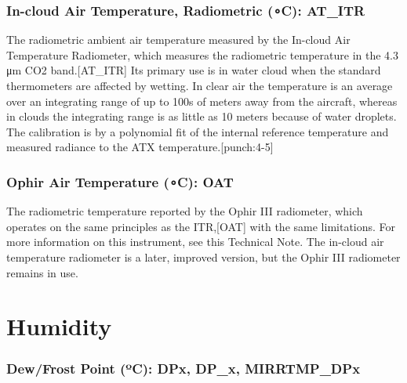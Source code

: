 \documentclass[
  english,
]{book}
\begin{document}
\hypertarget{AT-ITR}{%
\subsubsection*{\texorpdfstring{In-cloud Air Temperature, Radiometric ({∘}C): AT\_ITR}{In-cloud Air Temperature, Radiometric (∘C): AT\_ITR}}\label{AT-ITR}}

The radiometric ambient air temperature measured by the In-cloud Air Temperature Radiometer, which measures the radiometric temperature in the 4.3 {μ}m CO{2} band.\protect\hypertarget{AT_ITR}{}{{[}AT\_ITR{]}} Its primary use is in water cloud when the standard thermometers are affected by wetting. In clear air the temperature is an average over an integrating range of up to 100s of meters away from the aircraft, whereas in clouds the integrating range is as little as 10 meters because of water droplets. The calibration is by a polynomial fit of the internal reference temperature and measured radiance to the ATX temperature.\protect\hypertarget{punch:4-5}{}{{[}punch:4-5{]}}

\hypertarget{OAT}{%
\subsubsection*{\texorpdfstring{Ophir Air Temperature ({∘}C): OAT}{Ophir Air Temperature (∘C): OAT}}\label{OAT}}

The radiometric temperature reported by the Ophir III radiometer, which operates on the same principles as the ITR,\protect\hypertarget{OAT}{}{{[}OAT{]}} with the same limitations. For more information on this instrument, see this Technical Note. The in-cloud air temperature radiometer is a later, improved version, but the Ophir III radiometer remains in use.

\hypertarget{humidity}{%
\section{Humidity}\label{humidity}}

\hypertarget{dew-point}{%
\subsubsection*{\texorpdfstring{Dew/Frost Point ({º}C): DPx, DP\_x, MIRRTMP\_DPx}{Dew/Frost Point (ºC): DPx, DP\_x, MIRRTMP\_DPx}}\label{dew-point}}
\end{document}
